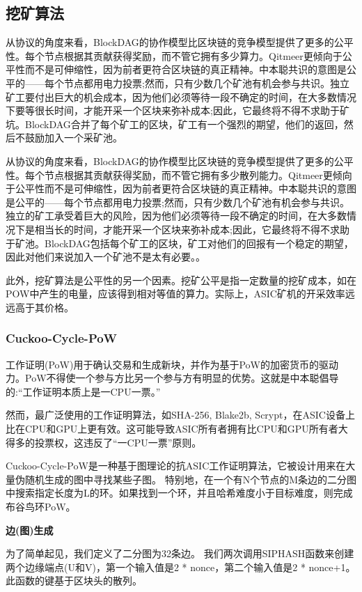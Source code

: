 \documentclass[a4paper,11pt]{article}
\begin{document}
\subsection{挖矿算法}

从协议的角度来看，BlockDAG的协作模型比区块链的竞争模型提供了更多的公平性。每个节点根据其贡献获得奖励，而不管它拥有多少算力。Qitmeer更倾向于公平性而不是可伸缩性，因为前者更符合区块链的真正精神。中本聪共识的意图是公平的——每个节点都用电力投票;然而，只有少数几个矿池有机会参与共识。独立矿工要付出巨大的机会成本，因为他们必须等待一段不确定的时间，在大多数情况下要等很长时间，才能开采一个区块来弥补成本;因此，它最终将不得不求助于矿坑。BlockDAG合并了每个矿工的区块，矿工有一个强烈的期望，他们的返回，然后不鼓励加入一个采矿池。

从协议的角度来看，BlockDAG的协作模型比区块链的竞争模型提供了更多的公平性。每个节点根据其贡献获得奖励，而不管它拥有多少散列能力。Qitmeer更倾向于公平性而不是可伸缩性，因为前者更符合区块链的真正精神。中本聪共识的意图是公平的——每个节点都用电力投票;然而，只有少数几个矿池有机会参与共识。独立的矿工承受着巨大的风险，因为他们必须等待一段不确定的时间，在大多数情况下是相当长的时间，才能开采一个区块来弥补成本;因此，它最终将不得不求助于矿池。BlockDAG包括每个矿工的区块，矿工对他们的回报有一个稳定的期望，因此对他们来说加入一个矿池不是太有必要。。

此外，挖矿算法是公平性的另一个因素。挖矿公平是指一定数量的挖矿成本，如在POW中产生的电量，应该得到相对等值的算力。实际上，ASIC矿机的开采效率远远高于其价格。

\subsubsection{Cuckoo-Cycle-PoW}
工作证明(PoW)用于确认交易和生成新块，并作为基于PoW的加密货币的驱动力。PoW不得使一个参与方比另一个参与方有明显的优势。这就是中本聪倡导的:“工作证明本质上是一CPU一票。”

然而，最广泛使用的工作证明算法，如SHA-256, Blake2b, Scrypt，在ASIC设备上比在CPU和GPU上更有效。这可能导致ASIC所有者拥有比CPU和GPU所有者大得多的投票权，这违反了“一CPU一票”原则。

Cuckoo-Cycle-PoW是一种基于图理论的抗ASIC工作证明算法，它被设计用来在大量伪随机生成的图中寻找某些子图。
特别地，在一个有N个节点的M条边的二分图中搜索指定长度为L的环。如果找到一个环，并且哈希难度小于目标难度，则完成布谷鸟环PoW。

\textbf{边(图)生成}


为了简单起见，我们定义了二分图为32条边。
我们两次调用SIPHASH函数来创建两个边缘端点(U和V)，第一个输入值是2 * nonce，第二个输入值是2 * nonce+1。
此函数的键基于区块头的散列。
\end{document}
